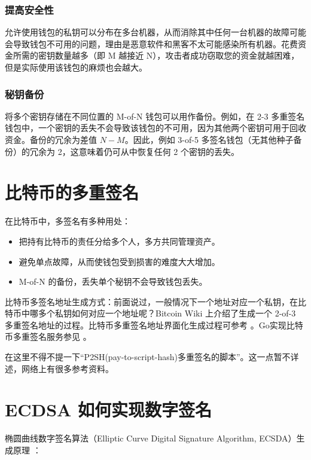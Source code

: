 \documentclass[a4paper,10pt]{article}
\begin{document}
\subsubsection{提高安全性}

允许使用钱包的私钥可以分布在多台机器，从而消除其中任何一台机器的故障可能会导致钱包不可用的问题，理由是恶意软件和黑客不太可能感染所有机器。花费资金所需的密钥数量越多（即 M 越接近 N），攻击者成功窃取您的资金就越困难，但是实际使用该钱包的麻烦也会越大。

\subsubsection{秘钥备份}

将多个密钥存储在不同位置的 M-of-N 钱包可以用作备份。例如，在 2-3 多重签名钱包中，一个密钥的丢失不会导致该钱包的不可用，因为其他两个密钥可用于回收资金。备份的冗余为差值 \(N-M\)。因此，例如 3-of-5 多签名钱包（无其他种子备份）的冗余为 2，这意味着仍可从中恢复任何 2 个密钥的丢失。

\section{比特币的多重签名}
在比特币中，多签名有多种用处：
\begin{itemize}
  \item 把持有比特币的责任分给多个人，多方共同管理资产。
  \item 避免单点故障，从而使钱包受到损害的难度大大增加。
  \item M-of-N 的备份，丢失单个秘钥不会导致钱包丢失。
\end{itemize}

比特币多签名地址生成方式：前面说过，一般情况下一个地址对应一个私钥，在比特币中哪多个私钥如何对应一个地址呢？Bitcoin Wiki \cite{BitCoin Wiki} 上介绍了生成一个 2-of-3 多重签名地址的过程。比特币多重签名地址界面化生成过程可参考 \cite{比特币多重签名机制使用篇}。Go实现比特币多重签名服务参见 \cite{Go 实现比特币多重签名服务}。

在这里不得不提一下“P2SH(pay-to-script-hash)多重签名的脚本\cite{P2SH(pay-to-script-hash)多重签名的脚本}”。这一点暂不详述，网络上有很多参考资料。

\section{ECDSA 如何实现数字签名}
椭圆曲线数字签名算法（Elliptic Curve Digital Signature Algorithm, ECSDA）生成原理 \cite{应用密码学}：
\end{document}
